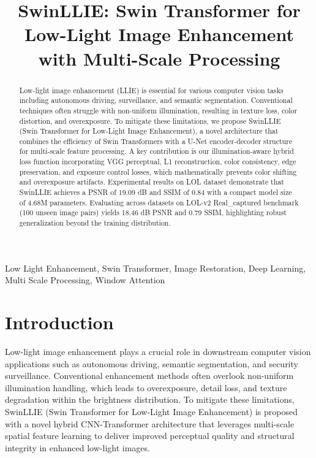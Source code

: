 \documentclass[conference]{IEEEtran}
\begin{document}
\title{SwinLLIE: Swin Transformer for Low-Light Image Enhancement with Multi-Scale Processing}

\maketitle

\begin{abstract}
Low-light image enhancement (LLIE) is essential for various computer vision tasks including autonomous driving, surveillance, and semantic segmentation. Conventional techniques often struggle with non-uniform illumination, resulting in texture loss, color distortion, and overexposure. To mitigate these limitations, we propose SwinLLIE (Swin Transformer for Low-Light Image Enhancement), a novel architecture that combines the efficiency of Swin Transformers with a U-Net encoder-decoder structure for multi-scale feature processing. A key contribution is our illumination-aware hybrid loss function incorporating VGG perceptual, L1 reconstruction, color consistency, edge preservation, and exposure control losses, which mathematically prevents color shifting and overexposure artifacts. Experimental results on LOL dataset demonstrate that SwinLLIE achieves a PSNR of 19.09 dB and SSIM of 0.84 with a compact model size of 4.68M parameters. Evaluating across datasets on LOL-v2 Real\_captured benchmark (100 unseen image pairs) yields 18.46 dB PSNR and 0.79 SSIM, highlighting robust generalization beyond the training distribution.
\end{abstract}

\begin{IEEEkeywords}
Low Light Enhancement, Swin Transformer, Image Restoration, Deep Learning, Multi Scale Processing, Window Attention
\end{IEEEkeywords}

\section{Introduction}

Low-light image enhancement plays a crucial role in downstream computer vision applications such as autonomous driving, semantic segmentation, and security surveillance. Conventional enhancement methods often overlook non-uniform illumination handling, which leads to overexposure, detail loss, and texture degradation within the brightness distribution. To mitigate these limitations, SwinLLIE (Swin Transformer for Low-Light Image Enhancement) is proposed with a novel hybrid CNN-Transformer architecture that leverages multi-scale spatial feature learning to deliver improved perceptual quality and structural integrity in enhanced low-light images.
\end{document}
